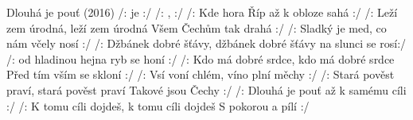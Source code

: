 \begin{TEXT}{Dlouhá je pouť (2016)} %
\SLOKA /:  je    :/
/:  ,  
  :/
\SLOKA /: Kde hora Říp až k obloze sahá :/
/: Leží zem úrodná, leží zem úrodná
Všem Čechům tak drahá :/
\SLOKA /: Sladký je med, co nám včely nosí :/
/: Džbánek dobré šťávy, džbánek dobré šťávy
na slunci se rosí:/
\SLOKA /: od hladinou hejna ryb se honí :/
/: Kdo má dobré srdce, kdo má dobré srdce
Před tím vším se skloní :/
\SLOKA /: Vsí voní chlém, víno plní měchy :/
/: Stará pověst praví, stará pověst praví
Takové jsou Čechy :/
\SLOKA /: Dlouhá je pouť až k samému cíli :/
/: K tomu cíli dojdeš, k tomu cíli dojdeš
S pokorou a pílí :/

\end{TEXT}